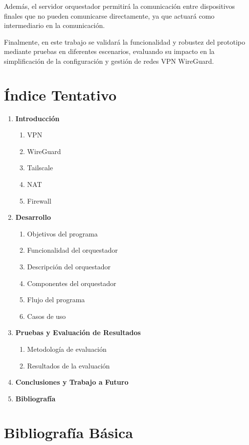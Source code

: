 \documentclass[letterpaper,12pt,oneside]{article}
\begin{document}
Además, el servidor orquestador permitirá la comunicación entre dispositivos finales que no pueden comunicarse directamente, ya que actuará como intermediario en la comunicación.

Finalmente, en este trabajo se validará la funcionalidad y robustez del prototipo mediante pruebas en diferentes escenarios, evaluando su impacto en la simplificación de la configuración y gestión de redes VPN WireGuard.

\section{Índice Tentativo}

\begin{enumerate}
    \item \textbf{Introducción}
    \begin{enumerate}
        \item VPN
        \item WireGuard
        \item Tailscale
        \item NAT
        \item Firewall
    \end{enumerate}
    \item \textbf{Desarrollo}
    \begin{enumerate}
        \item Objetivos del programa
        \item Funcionalidad del orquestador
        \item Descripción del orquestador
        \item Componentes del orquestador
        \item Flujo del programa
        \item Casos de uso
    \end{enumerate}
    \item \textbf{Pruebas y Evaluación de Resultados}
    \begin{enumerate}
        \item Metodología de evaluación
        \item Resultados de la evaluación
    \end{enumerate}
    \item \textbf{Conclusiones y Trabajo a Futuro}
    \item \textbf{Bibliografía}
\end{enumerate}

\section{Bibliografía Básica}
\end{document}
